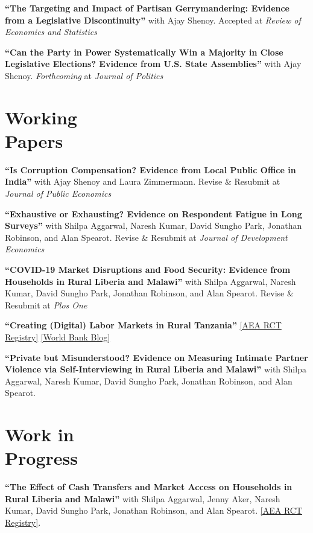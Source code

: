 \documentclass[letterpaper, margin, 10pt]{res} %
\begin{document}
\begin{resume}
\normalsize
{\bf ``{The Targeting and Impact of Partisan Gerrymandering: Evidence from a Legislative Discontinuity}''} with Ajay Shenoy. Accepted at \textit{Review of Economics and Statistics} 

\normalsize 
{\bf ``{Can the Party in Power Systematically Win a Majority in Close Legislative Elections? Evidence from U.S. State Assemblies}''} with Ajay Shenoy. \textit{Forthcoming} at \textit{Journal of Politics}



\normalsize\section{\textbf{Working \\ Papers}}
\normalsize
{\bf ``Is Corruption Compensation? Evidence from Local Public Office in India''} 
with Ajay Shenoy and Laura Zimmermann. Revise \& Resubmit at \textit{Journal of Public Economics} 

{\bf ``Exhaustive or Exhausting? Evidence on Respondent Fatigue in Long Surveys''}
with Shilpa Aggarwal, Naresh Kumar, David Sungho Park, Jonathan Robinson, and Alan Spearot. Revise \& Resubmit at \textit{Journal of Development Economics} 

\normalsize 
{\bf ``COVID-19 Market Disruptions and Food Security: Evidence from Households in Rural Liberia and Malawi''} with Shilpa Aggarwal, Naresh Kumar, David Sungho Park, Jonathan Robinson, and Alan Spearot. Revise \& Resubmit at \textit{Plos One}

\normalsize 
{\bf ``{Creating (Digital) Labor Markets in Rural Tanzania}''} \href{https://www.socialscienceregistry.org/trials/4483}{{[AEA RCT Registry]}} \href{https://blogs.worldbank.org/impactevaluations/using-sms-transform-agricultural-labor-markets-tanzania-guest-post-dahyeon-jeong}{{[World Bank Blog]}}


{\bf ``Private but Misunderstood? Evidence on Measuring Intimate Partner Violence via Self-Interviewing in Rural Liberia and Malawi''}
with Shilpa Aggarwal, Naresh Kumar, David Sungho Park, Jonathan Robinson, and Alan Spearot.



\normalsize\section{\textbf{Work in  \\ Progress}}
{\bf ``{The Effect of Cash Transfers and Market Access on Households in Rural Liberia and Malawi}''}
 with Shilpa Aggarwal, Jenny Aker, Naresh Kumar, David Sungho Park, Jonathan Robinson, and Alan Spearot. \href{https://www.socialscienceregistry.org/trials/4869}{{[AEA RCT Registry]}}.
 

\end{resume}
\end{document}

